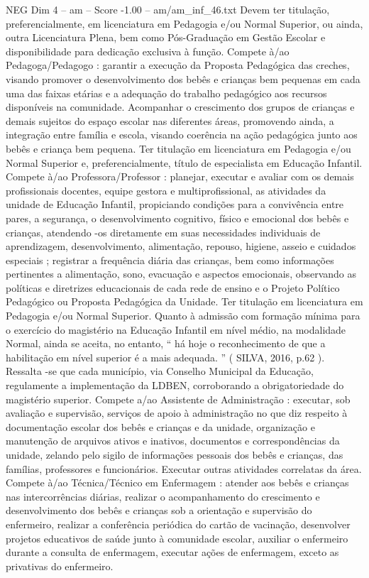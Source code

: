 \begin{textsample}{NEG Dim 4 – am – Score -1.00 – am/am\_inf\_46.txt}
Devem ter titulação, preferencialmente, em licenciatura em Pedagogia e/ou Normal Superior, ou ainda, outra Licenciatura Plena, bem como Pós-Graduação em Gestão Escolar e disponibilidade para dedicação exclusiva à função.
Compete à/ao Pedagoga/Pedagogo : garantir a execução da Proposta Pedagógica das creches, visando promover o desenvolvimento dos bebês e crianças bem pequenas em cada uma das faixas etárias e a adequação do trabalho pedagógico aos recursos disponíveis na comunidade.
Acompanhar o crescimento dos grupos de crianças e demais sujeitos do espaço escolar nas diferentes áreas, promovendo ainda, a integração entre família e escola, visando coerência na ação pedagógica junto aos bebês e criança bem pequena.
Ter titulação em licenciatura em Pedagogia e/ou Normal Superior e, preferencialmente, título de especialista em Educação Infantil.
Compete à/ao Professora/Professor : planejar, executar e avaliar com os demais profissionais docentes, equipe gestora e multiprofissional, as atividades da unidade de Educação Infantil, propiciando condições para a convivência entre pares, a segurança, o desenvolvimento cognitivo, físico e emocional dos bebês e crianças, atendendo -os diretamente em suas necessidades individuais de aprendizagem, desenvolvimento, alimentação, repouso, higiene, asseio e cuidados especiais ; registrar a frequência diária das crianças, bem como informações pertinentes a alimentação, sono, evacuação e aspectos emocionais, observando as políticas e diretrizes educacionais de cada rede de ensino e o Projeto Político Pedagógico ou Proposta Pedagógica da Unidade.
Ter titulação em licenciatura em Pedagogia e/ou Normal Superior.
Quanto à admissão com formação mínima para o exercício do magistério na Educação Infantil em nível médio, na modalidade Normal, ainda se aceita, no entanto, “ há hoje o reconhecimento de que a habilitação em nível superior é a mais adequada. ” ( SILVA, 2016, p.62 ).
Ressalta -se que cada município, via Conselho Municipal da Educação, regulamente a implementação da LDBEN, corroborando a obrigatoriedade do magistério superior.
Compete a/ao Assistente de Administração : executar, sob avaliação e supervisão, serviços de apoio à administração no que diz respeito à documentação escolar dos bebês e crianças e da unidade, organização e manutenção de arquivos ativos e inativos, documentos e correspondências da unidade, zelando pelo sigilo de informações pessoais dos bebês e crianças, das famílias, professores e funcionários.
Executar outras atividades correlatas da área.
Compete à/ao Técnica/Técnico em Enfermagem : atender aos bebês e crianças nas intercorrências diárias, realizar o acompanhamento do crescimento e desenvolvimento dos bebês e crianças sob a orientação e supervisão do enfermeiro, realizar a conferência periódica do cartão de vacinação, desenvolver projetos educativos de saúde junto à comunidade escolar, auxiliar o enfermeiro durante a consulta de enfermagem, executar ações de enfermagem, exceto as privativas do enfermeiro.

\end{textsample}
